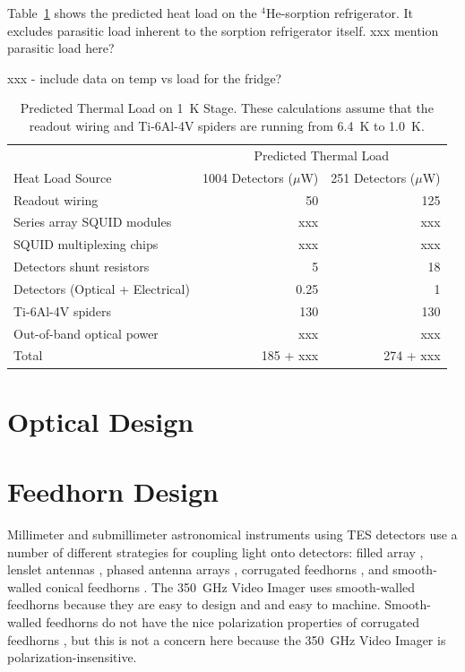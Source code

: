\documentclass[10pt,twocolumn,article]{memoir}
\newcommand*{\tableref}[1]{Table~\ref{#1}}
\newcommand*{\TES}{{\small TES}\xspace}
\newcommand*{\He}[1]{$^{#1}$He\xspace}
\newcommand*{\uW}{\ensuremath{\mu}W\xspace}
\newcommand*{\Imager}{350~GHz Video Imager\xspace}
\begin{document}
\tableref{tab:fp-thermal-load} shows the predicted heat load on the \He4-sorption refrigerator.
It excludes parasitic load inherent to the sorption refrigerator itself. xxx mention parasitic load here?

xxx - include data on temp vs load for the fridge?

\begin{table}[ht]
\centering
\caption{Predicted Thermal Load on 1~K Stage. These calculations assume that the readout wiring and Ti-6Al-4V spiders are running from 6.4~K to 1.0~K.}
\label{tab:fp-thermal-load}
\begin{tabular}{@{}lrr@{}}
\toprule
 & \multicolumn{2}{c}{Predicted Thermal Load} \\
\cmidrule(r){2-3}
Heat Load Source & 1004 Detectors (\uW) &  251 Detectors (\uW) \\
\midrule
Readout wiring 								& 50 & 125 \\
Series array SQUID modules 		& xxx & xxx \\
SQUID multiplexing chips 				& xxx & xxx \\
Detectors shunt resistors 			& 5 & 18 \\
Detectors (Optical + Electrical)		& 0.25 & 1 \\
Ti-6Al-4V spiders 							& 130 & 130 \\
Out-of-band optical power 			& xxx & xxx \\
\midrule
Total												& 185 + xxx & 274 + xxx \\
\bottomrule
\end{tabular}
\end{table}

\section{Optical Design}\label{s:optical-design}

\section{Feedhorn Design}\label{s:feedhorn-design}

Millimeter and submillimeter astronomical instruments using \TES detectors use a number of different strategies for coupling light onto detectors: filled array \cite{act,scuba}, lenslet antennas \cite{polarbear?}, phased antenna arrays \cite{jpl stuff}, corrugated feedhorns \cite{sptpol,actpol}, and smooth-walled conical feedhorns \cite{apex-sz,spt}.
The \Imager uses smooth-walled feedhorns because they are easy to design and and easy to machine.
Smooth-walled feedhorns do not have the nice polarization properties of corrugated feedhorns \cite{claricoats & olver?}, but this is not a concern here because the \Imager is polarization-insensitive.
\end{document}
